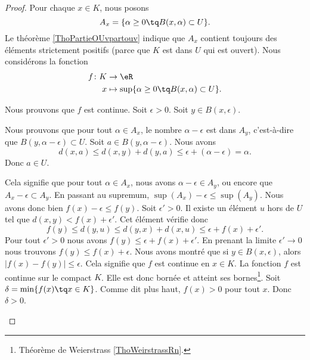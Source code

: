 \begin{proof}
	Pour chaque \( x\in K\), nous posons
	\begin{equation}
		A_x=\{ \alpha\geq 0\tq B(x,\alpha)\subset U \}.
	\end{equation}
	Le théorème \ref{ThoPartieOUvpartouv} indique que \( A_x\) contient toujours des éléments strictement positifs (parce que \( K\) est dans \( U\) qui est ouvert). Nous considérons la fonction
	\begin{equation}
		\begin{aligned}
			f\colon K & \to \eR                                                 \\
			x         & \mapsto \sup\{ \alpha\geq 0\tq B(x,\alpha)\subset U \}.
		\end{aligned}
	\end{equation}

	Nous prouvons que \( f\) est continue. Soit \( \epsilon>0\). Soit \( y\in B(x,\epsilon)\).
	\begin{subproof}
		Nous prouvons que pour tout \( \alpha\in A_x\), le nombre \( \alpha-\epsilon\) est dans \( A_y\), c'est-à-dire que \( B(y,\alpha-\epsilon)\subset U\). Soit \( a\in B(y,\alpha-\epsilon)\). Nous avons
		\begin{equation}
			d(x,a)\leq d(x,y)+d(y,a)\leq \epsilon+(\alpha-\epsilon)=\alpha.
		\end{equation}
		Donc \( a\in U\).

		Cela signifie que pour tout \( \alpha\in A_x\), nous avons \( \alpha-\epsilon\in A_y\), ou encore que \( A_x-\epsilon\subset A_y\). En passant au supremum, \( \sup(A_x)-\epsilon\leq \sup(A_y)\). Nous avons donc bien \( f(x)-\epsilon\leq f(y)\).
		Soit \( \epsilon'>0\). Il existe un élément \( u\) hors de \( U\) tel que \( d(x,y)<f(x)+\epsilon'\). Cet élément vérifie donc
		\begin{equation}
			f(y)\leq d(y,u)\leq d(y,x)+d(x,u)\leq \epsilon+f(x)+\epsilon'.
		\end{equation}
		Pour tout \( \epsilon'>0\) nous avons \( f(y)\leq \epsilon+f(x)+\epsilon'\). En prenant la limite \( \epsilon'\to 0\) nous trouvons \( f(y)\leq f(x)+\epsilon\).
		Nous avons montré que si \(  y\in B(x,\epsilon) \), alors \( | f(x)-f(y) |\leq \epsilon\). Cela signifie que \( f\) est continue en \( x\in K\).
		\spitem[Conclusion]
		La fonction \( f\) est continue sur le compact \( K\). Elle est donc bornée et atteint ses bornes\footnote{Théorème de Weierstrass \ref{ThoWeirstrassRn}.}. Soit \( \delta=\min\{ f(x)\tq x\in K \}\). Comme dit plus haut, \( f(x)>0\) pour tout \( x\). Donc \( \delta>0\).


\end{subproof}
\end{proof}
